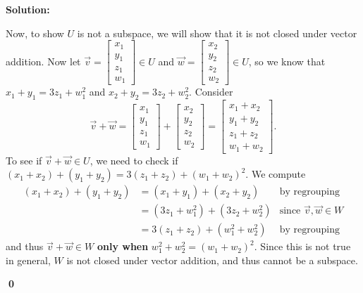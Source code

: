 \documentclass{article}
\newenvironment{solution}
{
  \ignorespaces
  \textbf{Solution:}
}
{
  \ignorespacesafterend
  \begin{flushright}
  {\bfseries \qed}
  \end{flushright}
}
\begin{document}
\begin{solution}
Now, to show \(U\) is not a subspace, we will show that it is not closed under vector addition.
Now let 
\(
  \vec v=\begin{bmatrix} x_1 \\y_1 \\ z_1 \\ w_1 \end{bmatrix}\in U
\) and
\(
  \vec w=\begin{bmatrix} x_2 \\y_2 \\ z_2 \\ w_2 \end{bmatrix} \in U
\),
so we know that \(x_1+y_1=3z_1+w_1^2\) and \(x_2+y_2=3z_2+w_2^2\).
Consider
\[\vec{v}+\vec{w}=
\begin{bmatrix} x_1 \\y_1 \\ z_1 \\ w_1\end{bmatrix}
+\begin{bmatrix} x_2 \\y_2 \\ z_2 \\ w_2 \end{bmatrix}
=\begin{bmatrix} x_1+x_2 \\y_1+y_2 \\ z_1+z_2 \\w_1+w_2 \end{bmatrix}
.\]
To see if \(\vec{v}+\vec{w} \in U\), we need to check if \( (x_1+x_2)+(y_1+y_2) = 3(z_1+z_2)+(w_1+w_2)^2\).
We compute
\begin{align*}
  (x_1+x_2)+(y_1+y_2) &= (x_1+y_1)+(x_2+y_2) &\text{by regrouping} \\
  &= (3z_1+w_1^2)+(3z_2+w_2^2) &\text{since \(\vec{v},\vec{w} \in W\)}\\
  &=3(z_1+z_2)+(w_1^2+w_2^2) &\text{by regrouping}
\end{align*}
and thus \(\vec v+\vec w\in W\) \textbf{only when} \(w_1^2+w_2^2=(w_1+w_2)^2\). Since this is not true in general, \(W\) is not closed under vector addition, and thus cannot be a subspace.


\end{solution}
\end{document}
